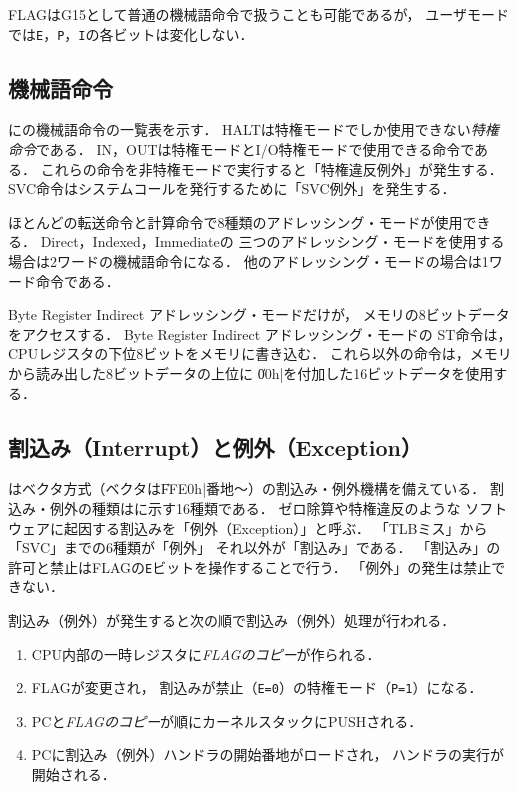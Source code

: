 FLAGはG15として普通の機械語命令で扱うことも可能であるが，
ユーザモードでは\texttt{E}，\texttt{P}，\texttt{I}の各ビットは変化しない．

\subsection{機械語命令}
に{\tac}の機械語命令の一覧表を示す．
HALTは特権モードでしか使用できない\emph{特権命令}である．
IN，OUTは特権モードとI/O特権モードで使用できる命令である．
これらの命令を非特権モードで実行すると「特権違反例外」が発生する．
SVC命令はシステムコールを発行するために「SVC例外」を発生する．

ほとんどの転送命令と計算命令で8種類のアドレッシング・モードが使用できる．
Direct，Indexed，Immediateの
三つのアドレッシング・モードを使用する場合は2ワードの機械語命令になる．
他のアドレッシング・モードの場合は1ワード命令である．

Byte Register Indirect アドレッシング・モードだけが，
メモリの8ビットデータをアクセスする．
Byte Register Indirect アドレッシング・モードの
ST命令は，CPUレジスタの下位8ビットをメモリに書き込む．
これら以外の命令は，メモリから読み出した8ビットデータの上位に
\|00h|を付加した16ビットデータを使用する．

\subsection{割込み（Interrupt）と例外（Exception）}
{\tac}はベクタ方式（ベクタは\|FFE0h|番地〜）の割込み・例外機構を備えている．
割込み・例外の種類はに示す16種類である．
ゼロ除算や特権違反のような
ソフトウェアに起因する割込みを「例外（Exception）」と呼ぶ．
「TLBミス」から「SVC」までの6種類が「例外」 それ以外が「割込み」である．
「割込み」の許可と禁止はFLAGの\texttt{E}ビットを操作することで行う．
「例外」の発生は禁止できない．

割込み（例外）が発生すると次の順で割込み（例外）処理が行われる．
\begin{enumerate}
\item CPU内部の一時レジスタに\emph{FLAGのコピー}が作られる．
\item FLAGが変更され，
割込みが禁止（\texttt{E=0}）の特権モード（\texttt{P=1}）になる．
\item PCと\emph{FLAGのコピー}が順にカーネルスタックにPUSHされる．
\item PCに割込み（例外）ハンドラの開始番地がロードされ，
ハンドラの実行が開始される．
\end{enumerate}

